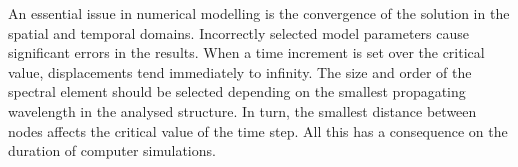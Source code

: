 An essential issue in numerical modelling is the convergence of the solution in the spatial and temporal domains.
Incorrectly selected model parameters cause significant errors in the results.
When a time increment is set over the critical value, displacements tend immediately to infinity.
The size and order of the spectral element should be selected depending on the smallest propagating wavelength in the analysed structure.
In turn, the smallest distance between nodes affects the critical value of the time step.
All this has a consequence on the duration of computer simulations.